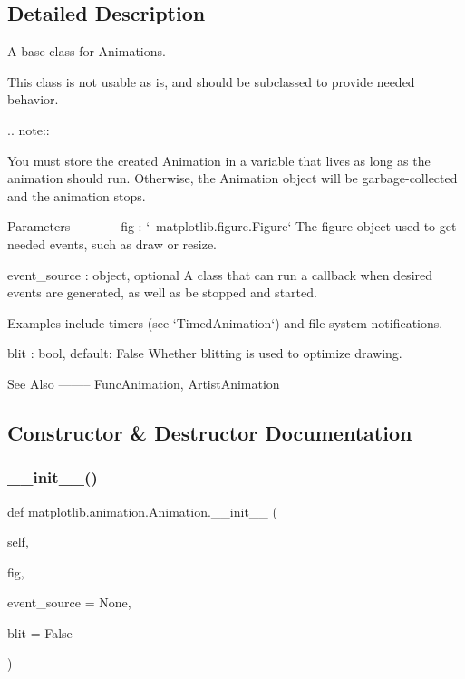 \subsection{Detailed Description}
\begin{DoxyVerb}A base class for Animations.

This class is not usable as is, and should be subclassed to provide needed
behavior.

.. note::

    You must store the created Animation in a variable that lives as long
    as the animation should run. Otherwise, the Animation object will be
    garbage-collected and the animation stops.

Parameters
----------
fig : `~matplotlib.figure.Figure`
    The figure object used to get needed events, such as draw or resize.

event_source : object, optional
    A class that can run a callback when desired events
    are generated, as well as be stopped and started.

    Examples include timers (see `TimedAnimation`) and file
    system notifications.

blit : bool, default: False
    Whether blitting is used to optimize drawing.

See Also
--------
FuncAnimation,  ArtistAnimation
\end{DoxyVerb}
 

\subsection{Constructor \& Destructor Documentation}
\mbox{\label{classmatplotlib_1_1animation_1_1Animation_ae37d92e1feb40bc1e99dbc67f19b63d0}} 
\subsubsection{\texorpdfstring{\+\_\+\+\_\+init\+\_\+\+\_\+()}{\_\_init\_\_()}}
{\footnotesize\ttfamily def matplotlib.\+animation.\+Animation.\+\_\+\+\_\+init\+\_\+\+\_\+ (\begin{DoxyParamCaption}\item[{}]{self,  }\item[{}]{fig,  }\item[{}]{event\+\_\+source = {\ttfamily None},  }\item[{}]{blit = {\ttfamily False} }\end{DoxyParamCaption})}

